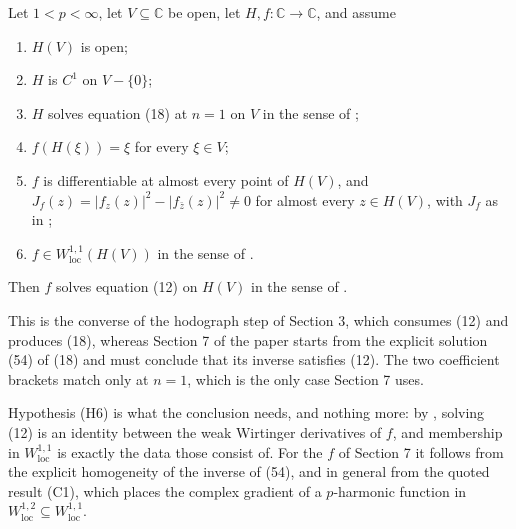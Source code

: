 \begin{lemma}
Let $1<p<\infty$, let $V\subseteq\mathbb{C}$ be open, let
$H,f\colon\mathbb{C}\to\mathbb{C}$, and assume
\begin{enumerate}
\item[(H1)] $H(V)$ is open;
\item[(H2)] $H$ is $C^1$ on $V-\{0\}$;
\item[(H3)] $H$ solves equation (18) at $n=1$ on $V$ in the sense of
  ;
\item[(H4)] $f(H(\xi))=\xi$ for every $\xi\in V$;
\item[(H5)] $f$ is differentiable at almost every point of $H(V)$, and
  $J_f(z)=|f_z(z)|^2-|f_{\bar z}(z)|^2\neq0$ for almost every $z\in H(V)$,
  with $J_f$ as in ;
\item[(H6)] $f\in W^{1,1}_{\mathrm{loc}}(H(V))$ in the sense of
  .
\end{enumerate}
Then $f$ solves equation (12) on $H(V)$ in the sense of .

This is the converse of the hodograph step of Section 3, which consumes
(12) and produces (18), whereas Section 7 of the paper starts from the
explicit solution (54) of (18) and must conclude that its inverse satisfies
(12).  The two coefficient brackets match only at $n=1$, which is the only
case Section 7 uses.

Hypothesis (H6) is what the conclusion needs, and nothing more: by
, solving (12) is an identity between the weak Wirtinger
derivatives of $f$, and membership in $W^{1,1}_{\mathrm{loc}}$ is exactly the
data those consist of.  For the $f$ of Section 7 it follows from the explicit
homogeneity of the inverse of (54), and in general from the quoted result
(C1), which places the complex gradient of a $p$-harmonic function in
$W^{1,2}_{\mathrm{loc}}\subseteq W^{1,1}_{\mathrm{loc}}$.
\end{lemma}
